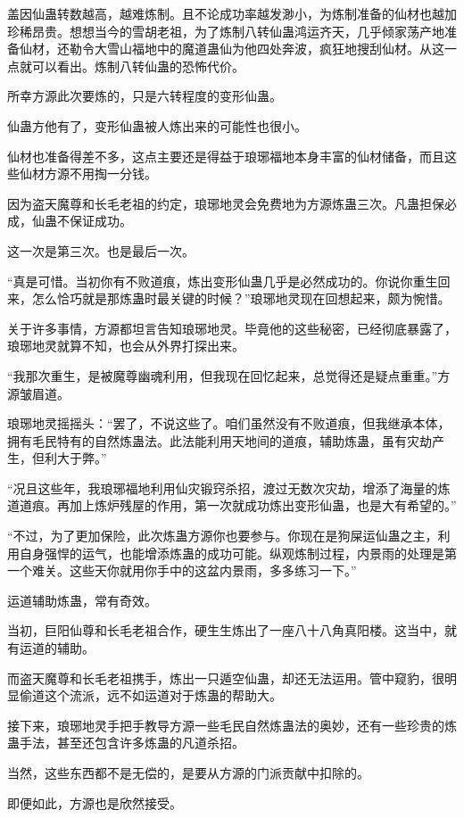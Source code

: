 \begin{this_body}
盖因仙蛊转数越高，越难炼制。且不论成功率越发渺小，为炼制准备的仙材也越加珍稀昂贵。想想当今的雪胡老祖，为了炼制八转仙蛊鸿运齐天，几乎倾家荡产地准备仙材，还勒令大雪山福地中的魔道蛊仙为他四处奔波，疯狂地搜刮仙材。从这一点就可以看出。炼制八转仙蛊的恐怖代价。

所幸方源此次要炼的，只是六转程度的变形仙蛊。

仙蛊方他有了，变形仙蛊被人炼出来的可能性也很小。

仙材也准备得差不多，这点主要还是得益于琅琊福地本身丰富的仙材储备，而且这些仙材方源不用掏一分钱。

因为盗天魔尊和长毛老祖的约定，琅琊地灵会免费地为方源炼蛊三次。凡蛊担保必成，仙蛊不保证成功。

这一次是第三次。也是最后一次。

“真是可惜。当初你有不败道痕，炼出变形仙蛊几乎是必然成功的。你说你重生回来，怎么恰巧就是那炼蛊时最关键的时候？”琅琊地灵现在回想起来，颇为惋惜。

关于许多事情，方源都坦言告知琅琊地灵。毕竟他的这些秘密，已经彻底暴露了，琅琊地灵就算不知，也会从外界打探出来。

“我那次重生，是被魔尊幽魂利用，但我现在回忆起来，总觉得还是疑点重重。”方源皱眉道。

琅琊地灵摇摇头：“罢了，不说这些了。咱们虽然没有不败道痕，但我继承本体，拥有毛民特有的自然炼蛊法。此法能利用天地间的道痕，辅助炼蛊，虽有灾劫产生，但利大于弊。”

“况且这些年，我琅琊福地利用仙灾锻窍杀招，渡过无数次灾劫，增添了海量的炼道道痕。再加上炼炉残屋的作用，第一次就成功炼出变形仙蛊，也是大有希望的。”

“不过，为了更加保险，此次炼蛊方源你也要参与。你现在是狗屎运仙蛊之主，利用自身强悍的运气，也能增添炼蛊的成功可能。纵观炼制过程，内景雨的处理是第一个难关。这些天你就用你手中的这盆内景雨，多多练习一下。”

运道辅助炼蛊，常有奇效。

当初，巨阳仙尊和长毛老祖合作，硬生生炼出了一座八十八角真阳楼。这当中，就有运道的辅助。

而盗天魔尊和长毛老祖携手，炼出一只遁空仙蛊，却还无法运用。管中窥豹，很明显偷道这个流派，远不如运道对于炼蛊的帮助大。

接下来，琅琊地灵手把手教导方源一些毛民自然炼蛊法的奥妙，还有一些珍贵的炼蛊手法，甚至还包含许多炼蛊的凡道杀招。

当然，这些东西都不是无偿的，是要从方源的门派贡献中扣除的。

即便如此，方源也是欣然接受。


\end{this_body}
